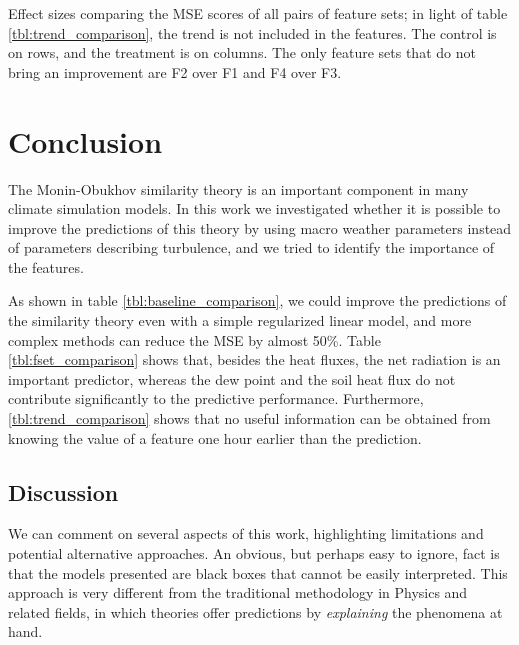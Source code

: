 \documentclass[a4paper]{book}
\begin{document}
\begin{table}
\caption{Effect sizes comparing the MSE scores of all pairs of feature sets; in light of table \ref{tbl:trend_comparison}, the trend is not included in the features. The control is on rows, and the treatment is on columns. The only feature sets that do not bring an improvement are F2 over F1 and F4 over F3.}
\label{tbl:fset_comparison}

\end{table}




\chapter{Conclusion}
\label{ch:conclusion}
The Monin-Obukhov similarity theory is an important component in many climate simulation models. In this work we investigated whether it is possible to improve the predictions of this theory by using macro weather parameters instead of parameters describing turbulence, and we tried to identify the importance of the features.

As shown in table \ref{tbl:baseline_comparison}, we could improve the predictions of the similarity theory even with a simple regularized linear model, and more complex methods can reduce the MSE by almost 50\%. Table \ref{tbl:fset_comparison} shows that, besides the heat fluxes, the net radiation is an important predictor, whereas the dew point and the soil heat flux do not contribute significantly to the predictive performance. Furthermore, \ref{tbl:trend_comparison} shows that no useful information can be obtained from knowing the value of a feature one hour earlier than the prediction.

\section{Discussion}
We can comment on several aspects of this work, highlighting limitations and potential alternative approaches. An obvious, but perhaps easy to ignore, fact is that the models presented are black boxes that cannot be easily interpreted. This approach is very different from the traditional methodology in Physics and related fields, in which theories offer predictions by \emph{explaining} the phenomena at hand. 
\end{document}
